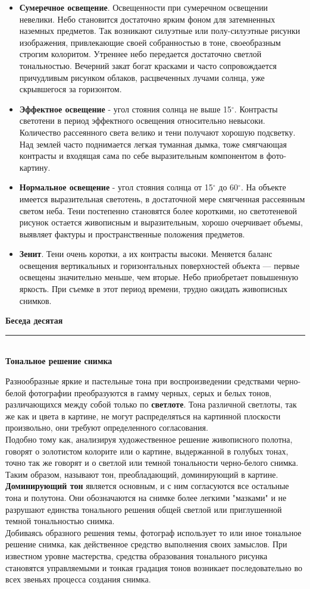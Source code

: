 \documentclass{article}
\renewcommand{\section}[2]{
	\vspace{2em}
	\begin{flushright}
		\Large
		\baselineskip=0.5\baselineskip
		\textbf{#1}
		\\
		\rule[0.5\baselineskip]{\textwidth}{0.15pt}
		\\
		\textbf{#2}
	\end{flushright}
}
\newcommand{\important}[1]{\textbf{#1}}
\begin{document}
\begin{itemize}
	\item \important{Сумеречное освещение}. Освещенности при сумеречном освещении невелики. Небо становится достаточно ярким фоном для затемненных наземных предметов. Так возникают силуэтные или полу-силуэтные рисунки изображения, привлекающие своей собранностью в тоне, своеобразным строгим колоритом. Утреннее небо передается достаточно светлой тональностью. Вечерний закат богат красками и часто сопровождается причудливым рисунком облаков, расцвеченных лучами солнца, уже скрывшегося за горизонтом.
	\item \important{Эффектное освещение} - угол стояния солнца не выше 15$^{\circ}$. Контрасты светотени в период эффектного освещения относительно невысоки. Количество рассеянного света велико и тени получают хорошую подсветку. Над землей часто поднимается легкая туманная дымка, тоже смягчающая контрасты и входящая сама по себе выразительным компонентом в фото-картину.
	\item \important{Нормальное освещение} - угол стояния солнца от 15$^{\circ}$ до 60$^{\circ}$. На объекте имеется выразительная светотень, в достаточной мере смягченная рассеянным светом неба. Тени постепенно становятся более короткими, но светотеневой рисунок остается живописным и выразительным, хорошо очерчивает объемы, выявляет фактуры и пространственные положения предметов.
	\item \important{Зенит}. Тени очень коротки, а их контрасты высоки. Меняется баланс освещения вертикальных и горизонтальных поверхностей объекта --- первые освещены значительно меньше, чем вторые. Небо приобретает повышенную яркость. При съемке в этот период времени, трудно ожидать живописных снимков.
\end{itemize}
\section{Беседа десятая}{Тональное решение снимка}
Разнообразные яркие и пастельные тона при воспроизведении средствами черно-белой фотографии преобразуются в гамму черных, серых и белых тонов, различающихся между собой только по \important{светлоте}. Тона различной светлоты, так же как и цвета в картине, не могут распределяться на картинной плоскости произвольно, они требуют определенного согласования.\\
Подобно тому как, анализируя художественное решение живописного полотна, говорят о золотистом колорите или о картине, выдержанной в голубых тонах, точно так же говорят и о светлой или темной тональности черно-белого снимка. Таким образом, называют тон, преобладающий, доминирующий в картине. \important{Доминирующий тон} является основным, и с ним согласуются все остальные тона и полутона. Они обозначаются на снимке более легкими "мазками" и не разрушают единства тонального решения общей светлой или приглушенной темной тональностью снимка.\\
Добиваясь образного решения темы, фотограф использует то или иное тональное решение снимка, как действенное средство выполнения своих замыслов. При известном уровне мастерства, средства образования тонального рисунка становятся управляемыми и тонкая градация тонов возникает последовательно во всех звеньях процесса создания снимка.
\end{document}
